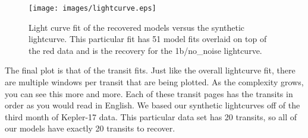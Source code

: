 \begin{figure}[h]
	\centering
	\texttt{[image: images/lightcurve.eps]}
	\caption{Light curve fit of the recovered models versus the synthetic lightcurve. This particular fit has 51 model fits overlaid on top of the red data and is the recovery for the 1b/no\_noise lightcurve.}
	\label{lc_fit}
\end{figure}

The final plot is that of the transit fits. Just like the overall lightcurve fit, there are multiple windows per transit that are being plotted. As the complexity grows, you can see this more and more. Each of these transit pages has the transits in order as you would read in English. We based our synthetic lightcurves off of the third month of Kepler-17 data. This particular data set has 20 transits, so all of our models have exactly 20 transits to recover.
